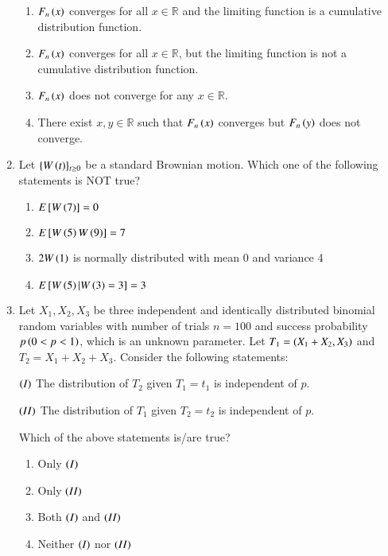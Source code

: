 \documentclass[journal]{IEEEtran}
\numberwithin{equation}{enumi}
\numberwithin{figure}{enumi}
\newcommand{\lt}{<}
\begin{document}
\begin{enumerate}
\begin{enumerate}
    \item $F_n\left(x\right)$ converges for all $x \in \mathbb{R}$ and the limiting function is a cumulative distribution function.
    \item $F_n\left(x\right)$ converges for all $x \in \mathbb{R}$, but the limiting function is not a cumulative distribution function.
    \item $F_n\left(x\right)$ does not converge for any $x \in \mathbb{R}$.
    \item There exist $x, y \in \mathbb{R}$ such that $F_n\left(x\right)$ converges but $F_n\left(y\right)$ does not converge.
\end{enumerate}

\item Let $\{W\left(t\right)\}_{t\geq 0}$ be a standard Brownian motion. Which one of the following statements is NOT true?

\begin{enumerate}
    \item $E{}\left[W\left(7\right)\right] = 0$
    \item $E{}\left[W\left(5\right)W\left(9\right)\right] = 7$
    \item $2W\left(1\right)$ is normally distributed with mean 0 and variance 4
    \item $E{}\left[W\left(5\right) | W\left(3\right) = 3\right] = 3$
\end{enumerate}

\item Let $X_1, X_2, X_3$ be three independent and identically distributed binomial random variables with number of trials $n = 100$ and success probability $p \brak{0 \lt p \lt 1}$, which is an unknown parameter. Let $T_1 = \left(X_1 + X_2, X_3\right)$ and $T_2 = X_1 + X_2 + X_3$. Consider the following statements:

$\left(I\right)$ The distribution of $T_2$ given $T_1 = t_1$ is independent of $p$.

$\left(II\right)$ The distribution of $T_1$ given $T_2 = t_2$ is independent of $p$.

Which of the above statements is/are true?

\begin{enumerate}
    \item Only $\left(I\right)$
    \item Only $\left(II\right)$
    \item Both $\left(I\right)$ and $\left(II\right)$
    \item Neither $\left(I\right)$ nor $\left(II\right)$
\end{enumerate}


\end{enumerate}
\end{document}
